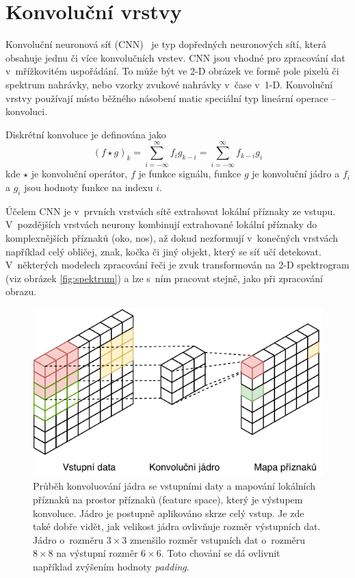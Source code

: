 \section{Konvoluční vrstvy}
Konvoluční neuronová síť (CNN)~\cite{6795724} je typ dopředných neuronových sítí, která obsahuje jednu či více konvolučních vrstev. CNN jsou vhodné pro zpracování dat v~mřížkovitém uspořádání. To může být ve 2-D obrázek ve formě pole pixelů či spektrum nahrávky, nebo vzorky zvukové nahrávky v~čase v~1-D. Konvoluční vrstvy používají místo běžného násobení matic speciální typ lineární operace -- konvoluci.

Diskrétní konvoluce je definována jako
\begin{equation}
   (f \star g)_k = \sum_{i=-\infty}^{\infty} f_i g_{k-i} = \sum_{i=-\infty}^{\infty} f_{k-i} g_{i}
\end{equation}
kde $\star$ je konvoluční operátor, $f$ je funkce signálu, funkce $g$ je konvoluční jádro a $f_i$ a $g_i$ jsou hodnoty funkce na indexu $i$.


Účelem CNN je v~prvních vrstvách sítě extrahovat lokální příznaky ze vstupu. V~pozdějších vrstvách neurony kombinují extrahované lokální příznaky do komplexnějších příznaků (oko, nos), až dokud nezformují v~konečných vrstvách například celý obličej, znak, kočka či jiný objekt, který se síť učí detekovat. V~některých modelech zpracování řeči je zvuk transformován na 2-D spektrogram (viz obrázek \ref{fig:spektrum}) a lze s~ním pracovat stejně, jako při zpracování obrazu.


\begin{figure}[H]
    \centering
    \includegraphics[scale=1.0]{obrazky-figures/convmapping.pdf}
    \caption{\label{fig:convmapping}Průběh konvoluování jádra se vstupními daty a mapování lokálních příznaků na prostor příznaků (feature space), který je výstupem konvoluce. Jádro je postupně aplikováno skrze celý vstup. Je zde také dobře vidět, jak velikost jádra ovlivňuje rozměr výstupních dat. Jádro o~rozměru $3 \times 3$ zmenšilo rozměr vstupních dat o~rozměru $8 \times 8$ na výstupní rozměr $6 \times 6$. Toto chování se dá ovlivnit například zvýšením hodnoty \textit{padding}.}
\end{figure}

